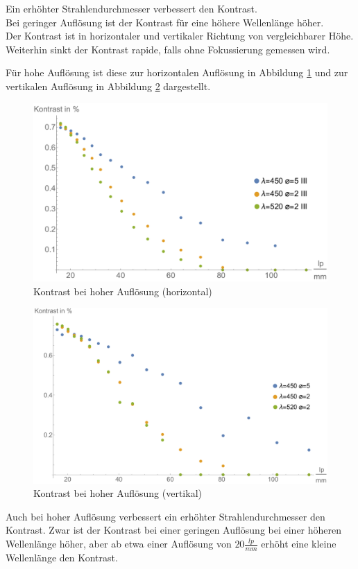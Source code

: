 \begin{minipage}{\linewidth}
Ein erhöhter Strahlendurchmesser verbessert den Kontrast.\\
Bei geringer Auflösung ist der Kontrast für eine höhere Wellenlänge höher.\\
Der Kontrast ist in horizontaler und vertikaler Richtung von vergleichbarer Höhe.\\
Weiterhin sinkt der Kontrast rapide, falls ohne Fokussierung gemessen wird.

Für hohe Auflösung ist diese zur horizontalen Auflösung in Abbildung \ref{fig:Versuch2_Plot2h2} und zur vertikalen Auflösung in Abbildung \ref{fig:Versuch2_Plot2v2} dargestellt.
\begin{figure}[H]
	\centering
\includegraphics[width=1.0\linewidth]{IMAGE/Versuch2Plot2horizontal2.pdf}
	\caption{Kontrast bei hoher Auflösung (horizontal)}
	\label{fig:Versuch2_Plot2h2}
\end{figure} 
\end{minipage}

\begin{figure}[H]
	\centering
\includegraphics[width=1.0\linewidth]{IMAGE/Versuch2Plot2vertikal2.pdf}
	\caption{Kontrast bei hoher Auflösung (vertikal)}
	\label{fig:Versuch2_Plot2v2}
\end{figure} 
Auch bei hoher Auflösung verbessert ein erhöhter Strahlendurchmesser  den Kontrast. Zwar ist der Kontrast bei einer geringen Auflösung bei einer höheren Wellenlänge höher, aber ab etwa einer Auflösung von $20 \frac{lp}{mm}$ erhöht eine kleine Wellenlänge den Kontrast.


